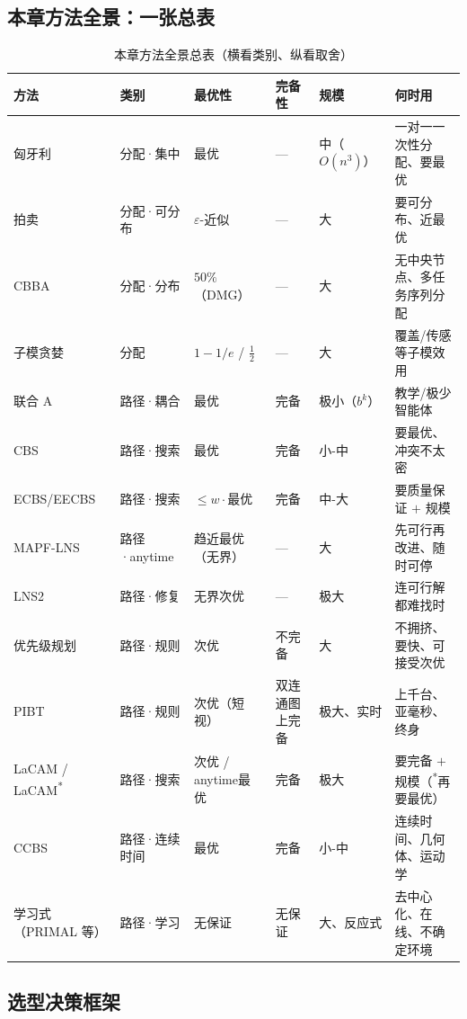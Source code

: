 \subsection{本章方法全景：一张总表}
\label{sec:mapf-mastertable}

\begin{table}[H]\centering\small
\caption{本章方法全景总表（横看类别、纵看取舍）}
\label{tab:mapf-master}
\begin{tabularx}{\linewidth}{lLLLLL}
\toprule
方法 & 类别 & 最优性 & 完备性 & 规模 & 何时用 \\
\midrule
匈牙利 & 分配·集中 & 最优 & --- & 中（$O(n^3)$） & 一对一一次性分配、要最优 \\
拍卖 & 分配·可分布 & $\varepsilon$-近似 & --- & 大 & 要可分布、近最优 \\
CBBA & 分配·分布 & $50\%$（DMG） & --- & 大 & 无中央节点、多任务序列分配 \\
子模贪婪 & 分配 & $1{-}1/e$ / $\tfrac12$ & --- & 大 & 覆盖/传感等子模效用 \\
联合 A\* & 路径·耦合 & 最优 & 完备 & 极小（$b^k$） & 教学/极少智能体 \\
CBS & 路径·搜索 & 最优 & 完备 & 小-中 & 要最优、冲突不太密 \\
ECBS/EECBS & 路径·搜索 & $\le w\cdot$最优 & 完备 & 中-大 & 要质量保证 $+$ 规模 \\
MAPF-LNS & 路径·anytime & 趋近最优（无界） & --- & 大 & 先可行再改进、随时可停 \\
LNS2 & 路径·修复 & 无界次优 & --- & 极大 & 连可行解都难找时 \\
优先级规划 & 路径·规则 & 次优 & 不完备 & 大 & 不拥挤、要快、可接受次优 \\
PIBT & 路径·规则 & 次优（短视） & 双连通图上完备 & 极大、实时 & 上千台、亚毫秒、终身 \\
LaCAM / LaCAM\textsuperscript{*} & 路径·搜索 & 次优 / anytime最优 & 完备 & 极大 & 要完备 $+$ 规模（\textsuperscript{*}再要最优） \\
CCBS & 路径·连续时间 & 最优 & 完备 & 小-中 & 连续时间、几何体、运动学 \\
学习式（PRIMAL 等） & 路径·学习 & 无保证 & 无保证 & 大、反应式 & 去中心化、在线、不确定环境 \\
\bottomrule
\end{tabularx}
\end{table}

\subsection{选型决策框架}
\label{sec:mapf-selection}


